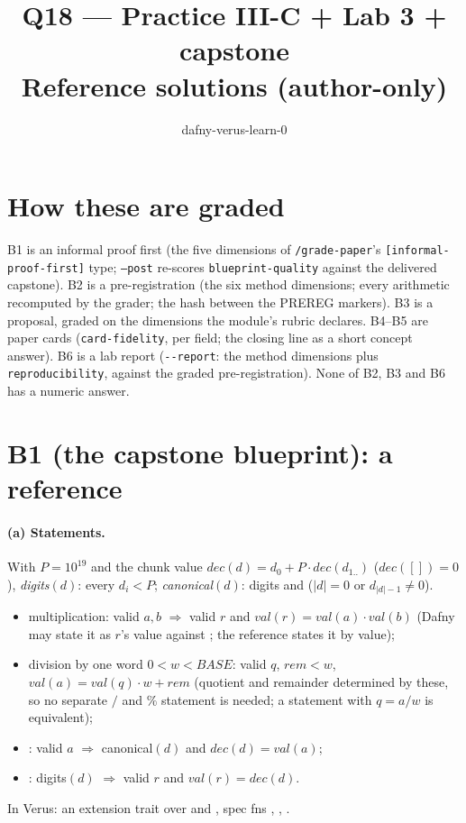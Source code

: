 \documentclass[11pt]{article}
\title{Q18 --- Practice III-C + Lab 3 + capstone \\ \large Reference solutions (author-only)}
\author{dafny-verus-learn-0}
\date{}
\begin{document}
\maketitle
\sloppy

\section*{How these are graded}
B1 is an informal proof first (the five dimensions of \texttt{/grade-paper}'s
\texttt{[informal-proof-first]} type; \texttt{--post} re-scores
\texttt{blueprint-quality} against the delivered capstone). B2 is a
pre-registration (the six method dimensions; every arithmetic recomputed by
the grader; the hash between the PREREG markers). B3 is a proposal, graded on
the dimensions the module's rubric declares. B4--B5 are paper cards
(\texttt{card-fidelity}, per field; the closing line as a short concept
answer). B6 is a lab report (\verb+--report+: the method dimensions plus
\texttt{reproducibility}, against the graded pre-registration). None of B2,
B3 and B6 has a numeric answer.

\section*{B1 (the capstone blueprint): a reference}

\paragraph{(a) Statements.} With $P = 10^{19}$ and the chunk value
$\mathit{dec}(d) = d_0 + P\cdot\mathit{dec}(d_{1..})$ ($\mathit{dec}([]) = 0$),
\emph{digits}$(d)$: every $d_i < P$; \emph{canonical}$(d)$: digits and
($|d| = 0$ or $d_{|d|-1} \ne 0$).
\begin{itemize}
\item multiplication: valid $a, b$ $\Rightarrow$ valid $r$ and
  $\mathit{val}(r) = \mathit{val}(a)\cdot\mathit{val}(b)$ (Dafny may state it
  as $r$'s value against ; the reference states it by value);
\item division by one word $0 < w < \mathit{BASE}$: valid $q$, $\mathit{rem} < w$,
  $\mathit{val}(a) = \mathit{val}(q)\cdot w + \mathit{rem}$ (quotient and
  remainder determined by these, so no separate $/$ and $\%$ statement is
  needed; a statement with $q = a / w$ is equivalent);
\item {}: valid $a$ $\Rightarrow$ canonical$(d)$ and
  $\mathit{dec}(d) = \mathit{val}(a)$;
\item {}: digits$(d)$ $\Rightarrow$ valid $r$ and
  $\mathit{val}(r) = \mathit{dec}(d)$.
\end{itemize}
In Verus: an extension trait  over 
and , spec fns , , .
\end{document}
